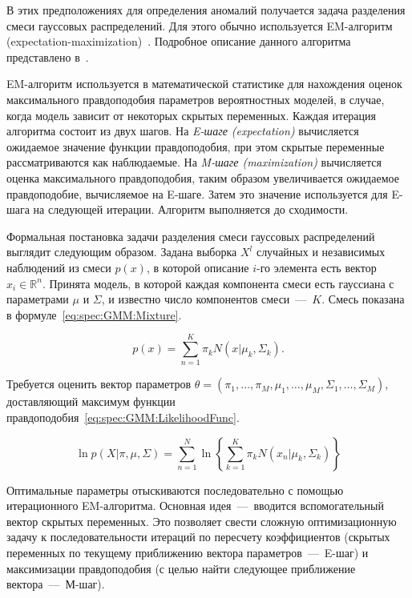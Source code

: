 В этих предположениях для определения аномалий получается задача разделения смеси гауссовых распределений. Для этого обычно используется EM-алгоритм (expectation-maximization)~\cite{MartinCompUnsupervisedDetectionMethods}. Подробное описание данного алгоритма представлено в~\cite{KorolevEMAlgo}.

EM-алгоритм используется в математической статистике для нахождения оценок максимального правдоподобия параметров вероятностных моделей, в случае, когда модель зависит от некоторых скрытых переменных. Каждая итерация алгоритма состоит из двух шагов. На \textit{E-шаге (expectation)} вычисляется ожидаемое значение функции правдоподобия, при этом скрытые переменные рассматриваются как наблюдаемые. На \textit{M-шаге (maximization)} вычисляется оценка максимального правдоподобия, таким образом увеличивается ожидаемое правдоподобие, вычисляемое на E-шаге. Затем это значение используется для E-шага на следующей итерации. Алгоритм выполняется до сходимости.

Формальная постановка задачи разделения смеси гауссовых распределений выглядит следующим образом. Задана выборка $X^l$ случайных и независимых наблюдений из смеси $p(x)$, в которой описание $i$-го элемента есть вектор $x_i\in \mathbb{R}^n$. Принята модель, в которой каждая компонента смеси есть гауссиана с параметрами $\mu$ и $\Sigma$, и известно число компонентов смеси~---~$K$. Смесь показана в формуле~\eqref{eq:spec:GMM:Mixture}.

\begin{equation} \label{eq:spec:GMM:Mixture}
p(x) = \sum_{n=1}^{K} \pi_k N(x|\mu_k,\Sigma_k).
\end{equation}

Требуется оценить вектор параметров $\theta = (\pi_1,\dots,\pi_M,\mu_1,\dots,\mu_M,\Sigma_1,\dots,\Sigma_M)$, доставляющий максимум функции правдоподобия~\eqref{eq:spec:GMM:LikelihoodFunc}.

\begin{equation} \label{eq:spec:GMM:LikelihoodFunc}
\ln p(X|\pi,\mu,\Sigma) = \sum_{n=1}^{N} \ln \left\{\sum_{k=1}^{K} \pi_k N(x_n|\mu_k,\Sigma_k)\right\}
\end{equation}

Оптимальные параметры отыскиваются последовательно с помощью итерационного EM-алгоритма. Основная идея~–--~вводится вспомогательный вектор скрытых переменных. Это позволяет свести сложную оптимизационную задачу к последовательности итераций по пересчету коэффициентов (скрытых переменных по текущему приближению вектора параметров~---~E-шаг) и максимизации правдоподобия (с целью найти следующее приближение вектора~---~М-шаг).

